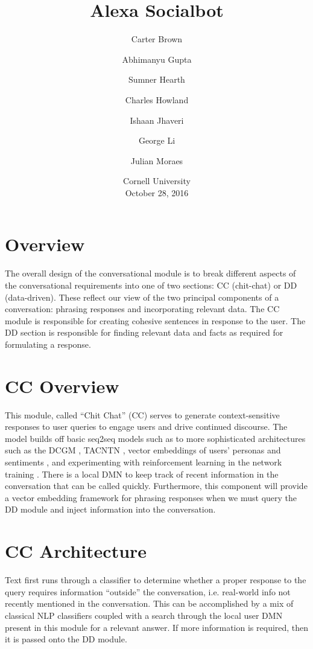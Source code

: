 \documentclass[10pt,twoside,twocolumn]{article}
\title{Alexa Socialbot}
\author{Carter Brown \and Abhimanyu Gupta \and Sumner Hearth \and Charles Howland \and Ishaan Jhaveri \and George Li \and Julian Moraes}
\date{%
    Cornell University\\%
    October 28, 2016\\%
}%
\begin{document}
\maketitle

\section{Overview}
The overall design of the conversational module is to break different aspects of the conversational requirements into one of two sections: CC (chit-chat) or DD (data-driven). These reflect our view of the two principal components of a conversation: phrasing responses and incorporating relevant data. The CC module is responsible for creating cohesive sentences in response to the user. The DD section is responsible for finding relevant data and facts as required for formulating a response.

\section{CC Overview}
This module, called ``Chit Chat'' (CC) serves to generate context-sensitive responses to user queries to engage users and drive continued discourse. The model builds off basic seq2seq models such as \cite{Vinyals2015} to more sophisticated architectures such as the DCGM \cite{Sordoni2015}, TACNTN \cite{Wu}, vector embeddings of users' personas and sentiments \cite{Li2016a}, and experimenting with reinforcement learning in the network training \cite{Zaremba2015, Williams2016, Li2016b}. There is a local DMN \cite{Kumar:2015, Xiong2016} to keep track of recent information in the conversation that can be called quickly. Furthermore, this component will provide a vector embedding framework for phrasing responses when we must query the DD module and inject information into the conversation.

\section{CC Architecture}

Text first runs through a classifier to determine whether a proper response to the query requires information ``outside'' the conversation, i.e. real-world info not recently mentioned in the conversation. This can be accomplished by a mix of classical NLP classifiers coupled with a search through the local user DMN present in this module for a relevant answer. If more information is required, then it is passed onto the DD module.
\end{document}
